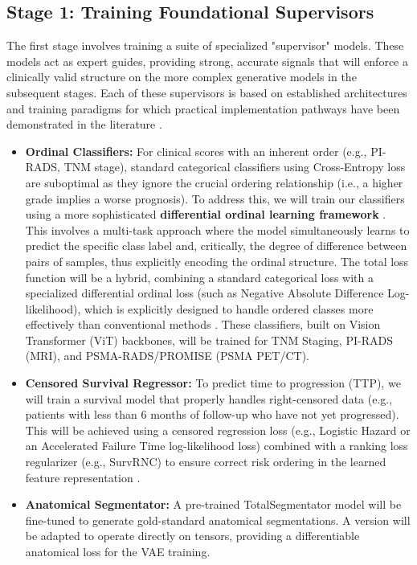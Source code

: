\documentclass[11pt, a4paper]{article}
\begin{document}
\subsection{Stage 1: Training Foundational Supervisors}
The first stage involves training a suite of specialized "supervisor" models. These models act as expert guides, providing strong, accurate signals that will enforce a clinically valid structure on the more complex generative models in the subsequent stages. Each of these supervisors is based on established architectures and training paradigms for which practical implementation pathways have been demonstrated in the literature \cite{LeeByeon2025, GrisiKartasalo2025, RivailVogl2023, MehtaShui2023}.
\begin{itemize}
    \item \textbf{Ordinal Classifiers:} For clinical scores with an inherent order (e.g., PI-RADS, TNM stage), standard categorical classifiers using Cross-Entropy loss are suboptimal as they ignore the crucial ordering relationship (i.e., a higher grade implies a worse prognosis). To address this, we will train our classifiers using a more sophisticated \textbf{differential ordinal learning framework} \cite{LeeByeon2025}. This involves a multi-task approach where the model simultaneously learns to predict the specific class label and, critically, the degree of difference between pairs of samples, thus explicitly encoding the ordinal structure. The total loss function will be a hybrid, combining a standard categorical loss with a specialized differential ordinal loss (such as Negative Absolute Difference Log-likelihood), which is explicitly designed to handle ordered classes more effectively than conventional methods \cite{GrisiKartasalo2025}. These classifiers, built on Vision Transformer (ViT) backbones, will be trained for TNM Staging, PI-RADS (MRI), and PSMA-RADS/PROMISE (PSMA PET/CT).
    \item \textbf{Censored Survival Regressor:} To predict time to progression (TTP), we will train a survival model that properly handles right-censored data (e.g., patients with less than 6 months of follow-up who have not yet progressed). This will be achieved using a censored regression loss (e.g., Logistic Hazard or an Accelerated Failure Time log-likelihood loss) combined with a ranking loss regularizer (e.g., SurvRNC) to ensure correct risk ordering in the learned feature representation \cite{GaoLi2019, RivailVogl2023, ShahinZhao2023, SaeedRidzuan2024, ApellnizParras2024}.
    \item \textbf{Anatomical Segmentator:} A pre-trained TotalSegmentator model will be fine-tuned to generate gold-standard anatomical segmentations. A version will be adapted to operate directly on tensors, providing a differentiable anatomical loss for the VAE training.

\end{itemize}
\end{document}
